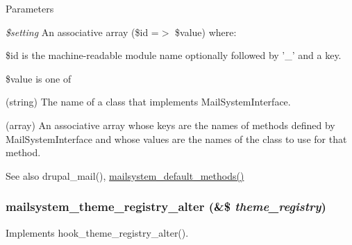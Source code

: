 \begin{DoxyParams}{Parameters}
\item[{\em \$setting}]An associative array (\$id =$>$ \$value) where:
\begin{DoxyItemize}
\item \$id is the machine-\/readable module name optionally followed by '\_\-' and a key.
\item \$value is one of
\begin{DoxyItemize}
\item (string) The name of a class that implements MailSystemInterface.
\item (array) An associative array whose keys are the names of methods defined by MailSystemInterface and whose values are the names of the class to use for that method.
\end{DoxyItemize}
\end{DoxyItemize}\end{DoxyParams}
\begin{DoxySeeAlso}{See also}
drupal\_\-mail(), \hyperlink{mailsystem_8module_a550d9fb0b029f862fbfdfc31670ca4da}{mailsystem\_\-default\_\-methods()} 
\end{DoxySeeAlso}
\hypertarget{mailsystem_8module_a07a179ae1d27c3fe2e0722316e6088e4}{
\subsubsection[{mailsystem\_\-theme\_\-registry\_\-alter}]{\setlength{\rightskip}{0pt plus 5cm}mailsystem\_\-theme\_\-registry\_\-alter (\&\$ {\em theme\_\-registry})}}
\label{mailsystem_8module_a07a179ae1d27c3fe2e0722316e6088e4}
Implements hook\_\-theme\_\-registry\_\-alter(). 